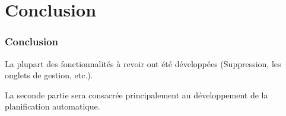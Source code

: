 \documentclass{beamer}
\begin{document}
\section*{Conclusion}

\begin{frame}
\frametitle{Conclusion}

La plupart des fonctionnalités à revoir ont été développées (Suppression, les onglets de gestion, etc.). 

\bigbreak

La seconde partie sera consacrée principalement au développement de la planification automatique. 


\end{frame}
\end{document}
